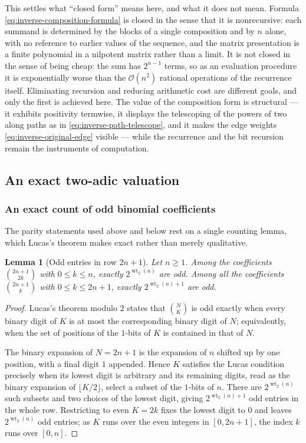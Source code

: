 \documentclass[11pt,oneside]{article}
\newtheorem{lemma}[theorem]{Lemma}
\theoremstyle{definition}
\theoremstyle{remark}
\newcommand{\wt}{\operatorname{wt}_2}
\newcommand{\bigO}{\mathcal O}
\begin{document}
This settles what ``closed form'' means here, and what it does not mean.  Formula
\eqref{eq:inverse-composition-formula} is closed in the sense that it is nonrecursive: each
summand is determined by the blocks of a single composition and by $n$ alone, with no
reference to earlier values of the sequence, and the matrix presentation is a finite
polynomial in a nilpotent matrix rather than a limit.  It is not closed in the sense of being
cheap: the sum has $2^{n-1}$ terms, so as an evaluation procedure it is exponentially worse
than the $\bigO(n^2)$ rational operations of the recurrence itself.  Eliminating recursion
and reducing arithmetic cost are different goals, and only the first is achieved here.  The
value of the composition form is structural --- it exhibits positivity termwise, it displays
the telescoping of the powers of two along paths as in \eqref{eq:inverse-path-telescope}, and
it makes the edge weights \eqref{eq:inverse-original-edge} visible --- while the recurrence
and the bit recursion remain the instruments of computation.

\subsection{An exact two-adic valuation}

\subsubsection{An exact count of odd binomial coefficients}

The parity statements used above and below rest on a single counting lemma, which Lucas's
theorem makes exact rather than merely qualitative.

\begin{lemma}[Odd entries in row $2n+1$]                    \label{lem:mom-lucas-count}
Let $n\ge1$.  Among the coefficients $\binom{2n+1}{2k}$ with $0\le k\le n$, exactly
$2^{\wt(n)}$ are odd.  Among all the coefficients $\binom{2n+1}{k}$ with $0\le k\le2n+1$,
exactly $2^{\wt(n)+1}$ are odd.
\end{lemma}

\begin{proof}
Lucas's theorem modulo $2$ \cite{fine1947} states that $\binom{N}{K}$ is odd exactly when
every binary digit of $K$ is at most the corresponding binary digit of $N$; equivalently,
when the set of positions of the $1$-bits of $K$ is contained in that of $N$.

The binary expansion of $N=2n+1$ is the expansion of $n$ shifted up by one position, with a
final digit $1$ appended.  Hence $K$ satisfies the Lucas condition precisely when its lowest
digit is arbitrary and its remaining digits, read as the binary expansion of
$\lfloor K/2\rfloor$, select a subset of the $1$-bits of $n$.  There are $2^{\wt(n)}$ such
subsets and two choices of the lowest digit, giving $2^{\wt(n)+1}$ odd entries in the whole
row.  Restricting to even $K=2k$ fixes the lowest digit to $0$ and leaves $2^{\wt(n)}$ odd
entries; as $K$ runs over the even integers in $[0,2n+1]$, the index $k$ runs over
$[0,n]$.
\end{proof}
\end{document}
